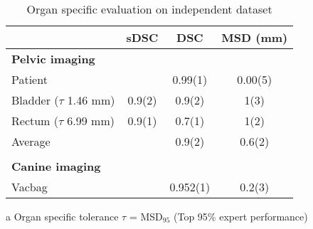 \begin{table}[!htbp]
\footnotesize
\caption{Organ specific evaluation on independent dataset}
\begin{threeparttable}[t]
  \centering
    \begin{tabular}{l c c c}
      & sDSC  & DSC         & MSD (mm)   \\
    \hline


    \textbf{Pelvic imaging}\tnote{a}     &              &              &       \\
    Patient                      &              & 0.99(1) & 0.00(5)  \\
    Bladder ($\tau$ 1.46 mm)     & 0.9(2)     & 0.9(2)     & 1(3)       \\
    Rectum ($\tau$ 6.99 mm)      & 0.9(1)     & 0.7(1)     & 1(2)       \\
    Average                      &              & 0.9(2)     & 0.6(2)   \\ \\
    \textbf{Canine imaging}      &              &              &           \\
    Vacbag                       &              & 0.952(1) & 0.2(3)    \\
    \hline
  \end{tabular}
  \begin{tablenotes}
    \scriptsize
  \item[a]Organ specific tolerance $\tau$ = MSD$_{95}$ (Top 95\% expert performance)
  \end{tablenotes}
\end{threeparttable}%
\label{tab:addlabel}%
\end{table}%
